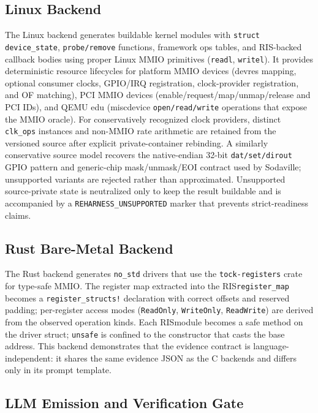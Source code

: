\documentclass[sigplan, screen, review, anonymous]{acmart}
\newcommand{\rislang}{RIS}
\begin{document}
\subsection{Linux Backend}

The Linux backend generates buildable kernel modules with \texttt{struct device\_state}, \texttt{probe/remove} functions, framework ops tables, and RIS-backed callback bodies using proper Linux MMIO primitives (\texttt{readl}, \texttt{writel}). It provides deterministic resource lifecycles for platform MMIO devices (devres mapping, optional consumer clocks, GPIO/IRQ registration, clock-provider registration, and OF matching), PCI MMIO devices (enable/request/map/unmap/release and PCI IDs), and QEMU edu (miscdevice \texttt{open/read/write} operations that expose the MMIO oracle). For conservatively recognized clock providers, distinct \texttt{clk\_ops} instances and non-MMIO rate arithmetic are retained from the versioned source after explicit private-container rebinding. A similarly conservative source model recovers the native-endian 32-bit \texttt{dat/set/dirout} GPIO pattern and generic-chip mask/unmask/EOI contract used by Sodaville; unsupported variants are rejected rather than approximated. Unsupported source-private state is neutralized only to keep the result buildable and is accompanied by a \texttt{REHARNESS\_UNSUPPORTED} marker that prevents strict-readiness claims.

\subsection{Rust Bare-Metal Backend}

The Rust backend generates \texttt{no\_std} drivers that use the \texttt{tock-registers} crate for type-safe MMIO. The register map extracted into the \rislang \texttt{register\_map} becomes a \texttt{register\_structs!} declaration with correct offsets and reserved padding; per-register access modes (\texttt{ReadOnly}, \texttt{WriteOnly}, \texttt{ReadWrite}) are derived from the observed operation kinds. Each \rislang module becomes a safe method on the driver struct; \texttt{unsafe} is confined to the constructor that casts the base address. This backend demonstrates that the evidence contract is language-independent: it shares the same evidence JSON as the C backends and differs only in its prompt template.

\subsection{LLM Emission and Verification Gate}
\end{document}
